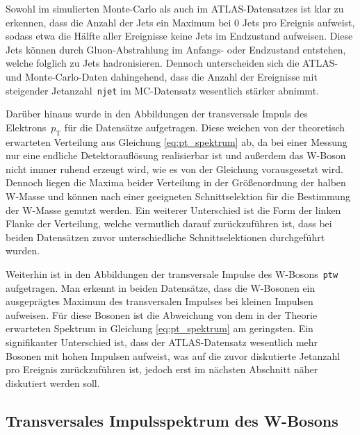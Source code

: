 \documentclass[11pt, a4paper]{article}
\numberwithin{equation}{section}
\begin{document}
Sowohl im simulierten Monte-Carlo als auch im ATLAS-Datensatzes ist klar zu erkennen, dass die Anzahl der Jets ein Maximum bei 0 Jets pro Ereignis aufweist, sodass etwa die Hälfte aller Ereignisse keine Jets im Endzustand aufweisen.
Diese Jets können durch Gluon-Abstrahlung im Anfangs- oder Endzustand entstehen, welche folglich zu Jets hadronisieren.
Dennoch unterscheiden sich die ATLAS- und Monte-Carlo-Daten dahingehend, dass die Anzahl der Ereignisse mit steigender Jetanzahl~\texttt{njet} im MC-Datensatz wesentlich stärker abnimmt.

Darüber hinaus wurde in den Abbildungen der transversale Impuls des Elektrons~$p_\mathrm{T}$ für die Datensätze aufgetragen.
Diese weichen von der theoretisch erwarteten Verteilung aus Gleichung \eqref{eq:pt_spektrum} ab, da bei einer Messung nur eine endliche Detektorauflösung realisierbar ist und außerdem das W-Boson nicht immer ruhend erzeugt wird, wie es von der Gleichung vorausgesetzt wird.
Dennoch liegen die Maxima beider Verteilung in der Größenordnung der halben W-Masse und können nach einer geeigneten Schnittselektion für die Bestimmung der W-Masse genutzt werden.
Ein weiterer Unterschied ist die Form der linken Flanke der Verteilung, welche vermutlich darauf zurückzuführen ist, dass bei beiden Datensätzen zuvor unterschiedliche Schnittselektionen durchgeführt wurden.

Weiterhin ist in den Abbildungen der transversale Impulse des W-Bosons~\texttt{ptw} aufgetragen.
Man erkennt in beiden Datensätze, dass die W-Bosonen ein ausgeprägtes Maximum des transversalen Impulses bei kleinen Impulsen aufweisen.
Für diese Bosonen ist die Abweichung von dem in der Theorie erwarteten Spektrum in Gleichung \eqref{eq:pt_spektrum} am geringsten.
Ein signifikanter Unterschied ist, dass der ATLAS-Datensatz wesentlich mehr Bosonen mit hohen Impulsen aufweist, was auf die zuvor diskutierte Jetanzahl pro Ereignis zurückzuführen ist, jedoch erst im nächsten Abschnitt näher diskutiert werden soll.

\clearpage
\subsection{Transversales Impulsspektrum des W-Bosons}
\label{ssec:ptw_spektrum}
\end{document}

